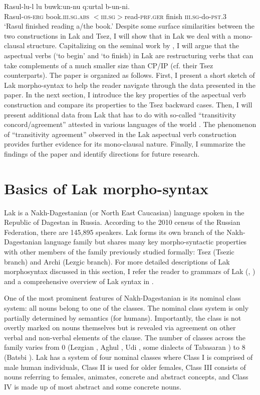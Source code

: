 \documentclass[output=paper]{langscibook}
\begin{document}
\ea\label{Rad3}
\gll Rasul-lu-l lu 	buwk:un-nu q:urtal b-un-ni.\\
Rasul-\textsc{os-erg} 		book.\textsc{iii.sg.abs} 	\textsc{$<$iii.sg$>$}read-\textsc{prf.ger}	finish 		\textsc{iii.sg}-do-\textsc{pst.3}\\
\glt ‘Rasul finished reading a/the book.’
\z
Despite some surface similarities between the two constructions in Lak and Tsez, I will show that in Lak we deal with a mono-clausal structure. Capitalizing on the seminal work by \citet{wurmbrand2001,Wurmbrand2004,Wurmbrand2007}, I will argue that the aspectual verbs (‘to begin’ and ‘to finish) in Lak are restructuring verbs that can take complements of a much smaller size than CP/IP (cf. their Tsez counterparts).
The paper is organized as follows. First, I present a short sketch of Lak morpho-syntax to help the reader navigate through the data presented in the paper. In the next section, I introduce the key properties of the aspectual verb construction and compare its properties to the Tsez backward cases. Then, I will present additional data from Lak that has to do with so-called “transitivity concord/agreement” attested in various languages of the world \citep{Zariquiey2014}. The phenomenon of “transitivity agreement” observed in the Lak aspectual verb construction provides further evidence for its mono-clausal nature. Finally, I summarize the findings of the paper and identify directions for future research.

\section{Basics of Lak morpho-syntax}\label{Radsect2}\largerpage[2]
Lak is a Nakh-Dagestanian (or North East Caucasian) language spoken in the Republic of Dagestan in Russia. According to the 2010 census of the Russian Federation, there are 145,895 speakers. Lak forms its own branch of the Nakh-Da\-ge\-stan\-ian language family but shares many key morpho-syntactic properties with other members of the family previously studied formally: Tsez (Tsezic branch) and Archi (Lezgic branch). For more detailed descriptions of Lak morphosyntax discussed in this section, I refer the reader to  grammars of Lak (\citealt{Zhirkov1955}, \citealt{Murkelinskij1971}) and a comprehensive overview of Lak syntax in \citet{Kazenin2013}.

One of the most prominent features of Nakh-Dagestanian is its nominal class system: all nouns belong to one of the classes. The nominal class system is only partially determined by semantics (for humans). Importantly, the class is not overtly marked on nouns themselves but is revealed via agreement on other verbal and non-verbal elements of the clause. The number of classes across the family varies from 0 (Lezgian \citep{Haspelmath1993}, Aghul \citep{Magometov1970}, Udi \citep{Harris2002}, some dialects of Tabasaran \citep{Magometov1965}) to 8 (Batsbi \citep{Desheriev1967}). Lak has a system of four nominal classes where Class I is comprised of male human individuals, Class II is used for older females, Class III consists of nouns referring to females, animates, concrete and abstract concepts, and Class IV is made up of most abstract and some concrete nouns.
\end{document}
